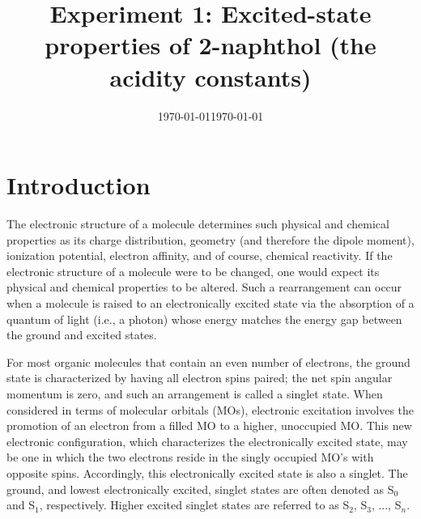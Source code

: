 \documentclass[byrevtex,amssymb,aps,pra,floatfix,letterpaper]{revtex4}
\date{\today}
\begin{document}
\title{Experiment 1: Excited-state properties of 2-naphthol (the acidity constants)}

\date{\today}

\maketitle

\section{Introduction}

The electronic structure of a molecule determines such physical and chemical properties as its charge distribution, geometry (and therefore the dipole moment), ionization potential, electron affinity, and of course, chemical reactivity. If the electronic structure of a molecule were to be changed, one would expect its physical and chemical properties to be altered. Such a rearrangement can occur when a molecule is raised to an electronically excited state via the absorption of a quantum of light (i.e., a photon) whose energy matches the energy gap between the ground and excited states.

For most organic molecules that contain an even number of electrons, the ground state is characterized by having all electron spins paired; the net spin angular momentum is zero, and such an arrangement is called a singlet state. When considered in terms of molecular orbitals (MOs), electronic excitation involves the promotion of an electron from a filled MO to a higher, unoccupied MO. This new electronic configuration, which characterizes the electronically excited state, may be one in which the two electrons reside in the singly occupied MO's with opposite spins. Accordingly, this electronically excited state is also a singlet. The ground, and lowest electronically excited, singlet states are often denoted as S$_0$ and S$_1$, respectively. Higher excited singlet states are referred to
as S$_2$, S$_3$, ..., S$_n$.
\end{document}

